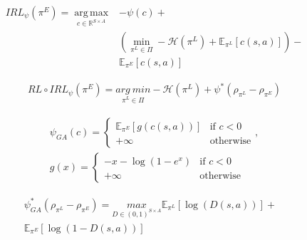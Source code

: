 \begin{equation}
    \label{formula:regularized_max_ent}
    \begin{aligned}
        IRL_{\psi}(\pi^{E}) = \underset{c \in \mathbb{R}^{S \times A}}{\operatorname{arg\,max}} &  - \psi(c) +  \\
        & \left(\underset{\pi^{L} \in \Pi}{\min} -\mathcal{H}(\pi^{L}) + \mathbb{E}_{\pi^{L}} \left [ c(s,a) \right ]\right) - \\
        &  \mathbb{E}_{\pi^{E}} \left [ c(s,a) \right ]
    \end{aligned}
\end{equation}

\begin{equation}
    \label{formula:policy_characterization}
    \begin{aligned}
    RL \circ IRL_{\psi}(\pi^{E}) = \underset{\pi^{L} \in \Pi}{arg \ min}-\mathcal{H}(\pi^{L}) + \psi^{*}(\rho_{\pi^{L}} - \rho_{\pi^{E}}) 
    \end{aligned}
\end{equation}

\begin{equation}
    \label{formula:ga_regularization}
    \begin{split}
    \psi_{GA}(c) = \left\{
    \begin{matrix}
        \mathbb{E}_{\pi^{E}}\left[ g(c(s,a)) \right] & \text{if } c < 0\\ 
        +\infty & \text{otherwise}
    \end{matrix}
    \right.,
    \\
    g(x) = \left\{
    \begin{matrix}
        -x - \log(1- e^{x}) & \text{if } c < 0\\ 
        +\infty & \text{otherwise}
    \end{matrix}
    \right.
    \end{split}
\end{equation}

\begin{equation}
    \begin{aligned}
    \label{formula:ga_regularizer_conjugate}
    \psi^{*}_{GA}(\rho_{\pi^{L}} - \rho_{\pi^{E}}) = \underset{D\in(0,1)^{S \times A}}{max} \mathbb{E}_{\pi^{L}}\left [ \log(D(s,a))\right ] + & \\ \mathbb{E}_{\pi^{E}}\left [ \log(1 - D(s,a))\right ]
\end{aligned}
\end{equation}